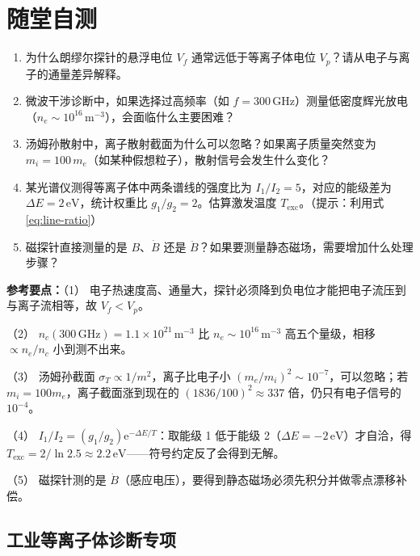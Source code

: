 \documentclass[12pt,a4paper,openany,oneside]{book}
\newcommand{\quizans}[1]{\par\medskip{\color{figGray}\rule{\linewidth}{0.3pt}}\par\smallskip
  {\footnotesize\textbf{参考要点：}#1}}
\newcommand{\ee}{\mathrm{e}}
\begin{document}
\section*{随堂自测}
{}

\begin{miniquiz}
\begin{enumerate}
    \item 为什么朗缪尔探针的悬浮电位 $V_f$ 通常远低于等离子体电位 $V_p$？请从电子与离子的通量差异解释。
    
    \item 微波干涉诊断中，如果选择过高频率（如 $f = 300\,\mathrm{GHz}$）测量低密度辉光放电（$n_e \sim 10^{16}\,\mathrm{m}^{-3}$），会面临什么主要困难？
    
    \item 汤姆孙散射中，离子散射截面为什么可以忽略？如果离子质量突然变为 $m_i = 100\,m_e$（如某种假想粒子），散射信号会发生什么变化？
    
    \item 某光谱仪测得等离子体中两条谱线的强度比为 $I_1/I_2 = 5$，对应的能级差为 $\Delta E = 2\,\mathrm{eV}$，统计权重比 $g_1/g_2 = 2$。估算激发温度 $T_{\mathrm{exc}}$。（提示：利用式\eqref{eq:line-ratio}）
    
    \item 磁探针直接测量的是 $B$、$\dot{B}$ 还是 $\ddot{B}$？如果要测量静态磁场，需要增加什么处理步骤？
\end{enumerate}
\quizans{（1） 电子热速度高、通量大，探针必须降到负电位才能把电子流压到与离子流相等，故 $V_f<V_p$。\par （2） $n_c(300\,\mathrm{GHz})=1.1\times10^{21}\,\mathrm{m^{-3}}$ 比 $n_e\sim10^{16}\,\mathrm{m^{-3}}$ 高五个量级，相移 $\propto n_e/n_c$ 小到测不出来。\par （3） 汤姆孙截面 $\sigma_T\propto1/m^2$，离子比电子小 $(m_e/m_i)^2\sim10^{-7}$，可以忽略；若 $m_i=100m_e$，离子截面涨到现在的 $(1836/100)^2\approx337$ 倍，仍只有电子信号的 $10^{-4}$。\par （4） $I_1/I_2=(g_1/g_2)\ee^{-\Delta E/T}$：取能级 1 低于能级 2（$\Delta E=-2\,\mathrm{eV}$）才自洽，得 $T_{\mathrm{exc}}=2/\ln2.5\approx2.2\,\mathrm{eV}$——符号约定反了会得到无解。\par （5） 磁探针测的是 $\dot B$（感应电压），要得到静态磁场必须先积分并做零点漂移补偿。}
\end{miniquiz}



\subsection{工业等离子体诊断专项}
\end{document}
